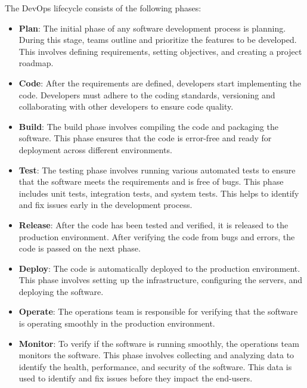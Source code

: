 The DevOps lifecycle consists of the following phases:
\begin{itemize}
    \item \textbf{Plan}:\newline
    The initial phase of any software development process is planning. During this stage, teams outline and prioritize the features to be developed. 
    This involves defining requirements, setting objectives, and creating a project roadmap.

    \item \textbf{Code}:\newline
    After the requirements are defined, developers start implementing the code. Developers must adhere to the coding standards, versioning and collaborating
    with other developers to ensure code quality.

    \item \textbf{Build}:\newline
    The build phase involves compiling the code and packaging the software. This phase ensures that the code is error-free and ready for deployment across 
    different environments.

    \item \textbf{Test}:\newline
    The testing phase involves running various automated tests to ensure that the software meets the requirements and is free of bugs. This phase includes 
    unit tests, integration tests, and system tests. This helps to identify and fix issues early in the development process.

    \item \textbf{Release}:\newline
    After the code has been tested and verified, it is released to the production environment. After verifying the code from bugs and errors, the code is 
    passed on the next phase.

    \item \textbf{Deploy}:\newline
    The code is automatically deployed to the production environment. This phase involves setting up the infrastructure, configuring the servers, and 
    deploying the software.

    \item \textbf{Operate}:\newline
    The operations team is responsible for verifying that the software is operating smoothly in the production environment.
    
    \item \textbf{Monitor}:\newline
    To verify if the software is running smoothly, the operations team monitors the software. This phase involves collecting and analyzing data to identify
    the health, performance, and security of the software. This data is used to identify and fix issues before they impact the end-users.
\end{itemize}

